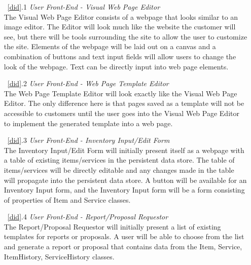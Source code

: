 \documentclass{article}
\newcommand{\br}{\vspace{2mm}}
\begin{document}
\begin{enumerate}
    \item[~\ref{did}.1 ] \emph{User Front-End - Visual Web Page Editor}\br\\
        The Visual Web Page Editor consists of a webpage that looks similar to
        an image editor.  The Editor will look much like the website the customer
        will see, but there will be tools surrounding the site to allow the
        user to customize the site.  Elements of the webpage will be laid out on
        a canvas and a combination of buttons and text input fields will allow
        users to change the look of the webpage.  Text can be directly input
        into web page elements.
    \item[~\ref{did}.2 ] \emph{User Front-End - Web Page Template Editor}\br\\
        The Web Page Template Editor will look exactly like the Visual Web
        Page Editor.  The only difference here is that pages saved as a template
        will not be accessible to customers until the user goes into the Visual
        Web Page Editor to implement the generated template into a web page.
    \item[~\ref{did}.3 ] \emph{User Front-End - Inventory Input/Edit Form}\br\\
        The Inventory Input/Edit Form will initially present itself as a webpage
        with a table of existing items/services in the persistent data store.  The
        table of items/services will be directly editable and any changes made in
        the table will propagate into the persistent data store.  A button will be
        available for an Inventory Input form, and the Inventory Input form will
        be a form consisting of properties of Item and Service classes.
    \item[~\ref{did}.4 ] \emph{User Front-End - Report/Proposal Requestor}\br\\
        The Report/Proposal Requestor will initially present a list of existing
        templates for reports or proposals.  A user will be able to choose from
        the list and generate a report or proposal that contains data from the
        Item, Service, ItemHistory, ServiceHistory classes.


\end{enumerate}
\end{document}
